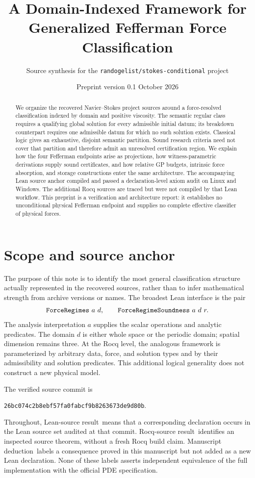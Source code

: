 \documentclass[11pt,a4paper]{article}
\title{\vspace{-1.2cm}A Domain-Indexed Framework for\\Generalized Fefferman Force Classification}
\author{Source synthesis for the \texttt{randogelist/stokes-conditional} project}
\date{Preprint version 0.1 \quad\textbullet\quad 25 October 2026}
\theoremstyle{remark}\newtheorem{remark}[proposition]{Remark}
\newcommand{\code}[1]{\nolinkurl{#1}}
\newcommand{\verified}{\textsf{Lean-source result}}
\newcommand{\rocq}{\textsf{Rocq-source result}}
\newcommand{\editorial}{\textsf{Manuscript deduction}}
\begin{document}
\maketitle
\thispagestyle{plain}
\begin{abstract}
We organize the recovered Navier--Stokes project sources around a force-resolved classification indexed by domain and positive viscosity. The semantic regular class requires a qualifying global solution for every admissible initial datum; its breakdown counterpart requires one admissible datum for which no such solution exists. Classical logic gives an exhaustive, disjoint semantic partition. Sound research criteria need not cover that partition and therefore admit an unresolved certification region. We explain how the four Fefferman endpoints arise as projections, how witness-parametric derivations supply sound certificates, and how relative GP budgets, intrinsic force absorption, and storage constructions enter the same architecture. The accompanying Lean source anchor compiled and passed a declaration-level axiom audit on Linux and Windows. The additional Rocq sources are traced but were not compiled by that Lean workflow. This preprint is a verification and architecture report: it establishes no unconditional physical Fefferman endpoint and supplies no complete effective classifier of physical forces.
\end{abstract}

\section{Scope and source anchor}
The purpose of this note is to identify the most general classification structure actually represented in the recovered sources, rather than to infer mathematical strength from archive versions or names. The broadest Lean interface is the pair
\[
  \text{\texttt{ForceRegimes}}\ a\ d,
  \qquad \text{\texttt{ForceRegimeSoundness}}\ a\ d\ r.
\]
The analysis interpretation $a$ supplies the scalar operations and analytic predicates. The domain $d$ is either whole space or the periodic domain; spatial dimension remains three. At the Rocq level, the analogous framework is parameterized by arbitrary data, force, and solution types and by their admissibility and solution predicates. This additional logical generality does not construct a new physical model.

The verified source commit is
\begin{center}\small\code{26bc074c2b8ebf57fa0fabcf9b8263673de9d80b}.\end{center}
Throughout, \verified\ means that a corresponding declaration occurs in the Lean source set audited at that commit. \rocq\ identifies an inspected source theorem, without a fresh Rocq build claim. \editorial\ labels a consequence proved in this manuscript but not added as a new Lean declaration. None of these labels asserts independent equivalence of the full implementation with the official PDE specification.
\end{document}
